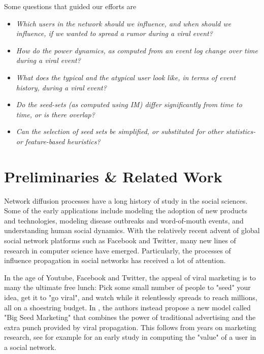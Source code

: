 \documentclass[sigconf]{acmart}
\begin{document}
Some questions that guided our efforts are 
\begin{itemize}
\item \emph{Which users in the network should we influence, and when should we influence, if we wanted to spread a rumor during a viral event?}

\item \emph{How do the power dynamics, as computed from an event log change over time during a viral event?}

\item \emph{What does the typical and the atypical user look like, in terms of event history, during a viral event?}

\item \emph{Do the seed-sets (as computed using IM) differ significantly from time to time, or is there overlap?}

\item \emph{Can the selection of seed sets be simplified, or substituted for other statistics- or feature-based heuristics? }

\end{itemize}

\section{Preliminaries \& Related Work}

Network diffusion processes have a long history of study in the social sciences. Some of the early applications include modeling the adoption of new products and technologies, modeling disease outbreaks and word-of-mouth events, and understanding human social dynamics. With the relatively recent advent of global social network platforms such as Facebook and Twitter, many new lines of research in computer science have emerged. Particularly, the processes of influence propagation in social networks has received a lot of attention.

In the age of Youtube, Facebook and Twitter, the appeal of viral marketing is to many the ultimate free lunch: Pick some small number of people to "seed" your idea, get it to "go viral", and watch while it relentlessly spreads to reach millions, all on a shoestring budget. In \cite{watts2007viral}, the authors instead propose a new model called "Big Seed Marketing" that combines the power of traditional advertising and the extra punch provided by viral propagation. This follows from years on marketing research, see for example \cite{domingos2001mining} for an early study in computing the "value" of a user in a social network. 
\end{document}
